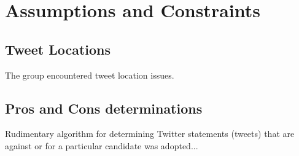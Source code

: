\documentclass[12pt]{article} %
\begin{document}
		
	
	
	
	
	
	
	
	

	

	
	
	
	
	\section{Assumptions and Constraints}
	
	\subsection{Tweet Locations}
	The group encountered tweet location issues. \\
	\subsection{Pros and Cons determinations}
	Rudimentary algorithm for determining Twitter statements (tweets) that are against or for a particular candidate was adopted... \\
	
\end{document}
